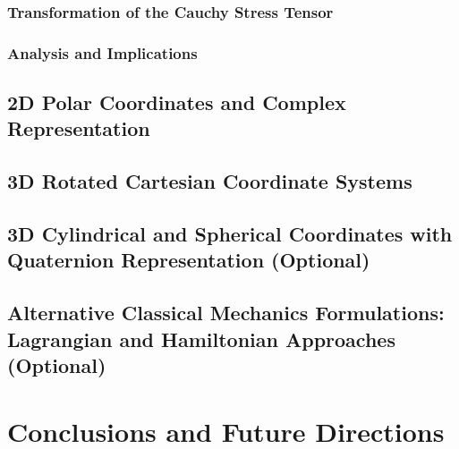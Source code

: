 \documentclass[12pt,a4paper,english]{article}
\begin{document}
\subsubsection{Transformation of the Cauchy Stress Tensor}
\subsubsection{Analysis and Implications}

\subsection{2D Polar Coordinates and Complex Representation}

\subsection{3D Rotated Cartesian Coordinate Systems}

\subsection{3D Cylindrical and Spherical Coordinates with Quaternion Representation (Optional)}

\subsection{Alternative Classical Mechanics Formulations: Lagrangian and Hamiltonian Approaches (Optional)}

\section{Conclusions and Future Directions}

\printbibliography
\end{document}
